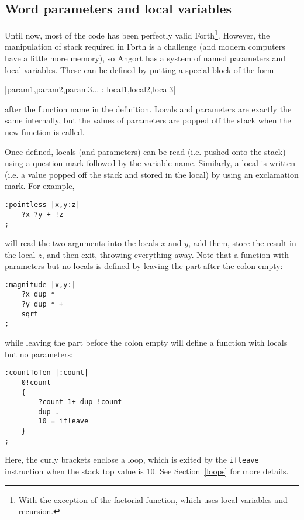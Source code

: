 \subsection{Word parameters and local variables}
Until now, most of the code has been perfectly valid Forth\footnote{With
the exception of the factorial function, which uses local variables
and recursion.}. However, the manipulation of
stack required in Forth is a challenge (and modern computers
have a little more memory), so Angort has a system of named
parameters and local variables. These can be defined by
putting a special block of the form
\begin{v}
|param1,param2,param3... : local1,local2,local3|
\end{v}
after the function name in the definition. Locals and parameters are
exactly the same internally, but the values of parameters are popped
off the stack when the new function is called. 


Once defined, locals (and parameters) can be read (i.e. pushed onto
the stack) using a question mark followed by the variable name.
Similarly, a local is written (i.e. a value popped off the stack and
stored in the local) by using an exclamation mark. For example,
\begin{lstlisting}
:pointless |x,y:z|
    ?x ?y + !z
;
\end{lstlisting}
will read the two arguments into the locals $x$ and $y$, add them,
store the result in the local $z$, and then exit, throwing everything away.
Note that a function with parameters but no locals is defined by leaving
the part after the colon empty:
\begin{lstlisting}
:magnitude |x,y:|
    ?x dup *
    ?y dup * +
    sqrt
;
\end{lstlisting}
while leaving the part before the colon empty will define a function with
locals but no parameters:
\begin{lstlisting}
:countToTen |:count|
    0!count
    {
        ?count 1+ dup !count
        dup .
        10 = ifleave
    }
;
\end{lstlisting}
Here, the curly brackets enclose a loop, which is exited by the
\texttt{ifleave} instruction when the stack top value is 10. See
Section~\ref{loops} for more details.

